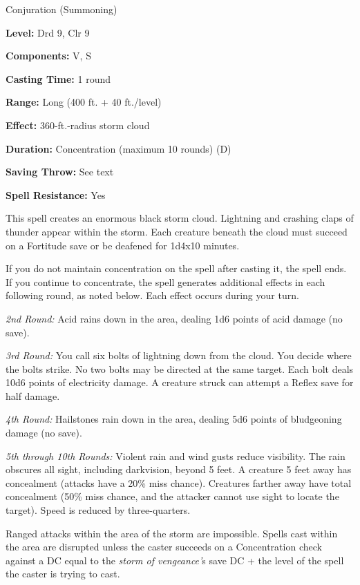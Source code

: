 
Conjuration (Summoning)

\textbf{Level:} Drd 9, Clr 9

\textbf{Components:} V, S

\textbf{Casting Time:} 1 round

\textbf{Range:} Long (400 ft. + 40 ft./level)

\textbf{Effect:} 360-ft.-radius storm cloud

\textbf{Duration:} Concentration (maximum 10 rounds) (D)

\textbf{Saving Throw:} See text

\textbf{Spell Resistance:} Yes

This spell creates an enormous black storm cloud. Lightning and crashing claps 
of thunder appear within the storm. Each creature beneath the cloud must succeed 
on a Fortitude save or be deafened for 1d4x10 minutes.

If you do not maintain concentration on the spell after casting it, the spell ends. 
 If you continue to concentrate, the spell generates additional effects in each 
following round, as noted below. Each effect occurs during your turn.

\textit{2nd Round:} Acid rains down in the area, dealing 1d6 points of acid damage 
(no save).

\textit{3rd Round:} You call six bolts of lightning down from the cloud. You decide 
where the bolts strike. No two bolts may be directed at the same target. Each bolt 
deals 10d6 points of electricity damage. A creature struck can attempt a Reflex 
save for half damage.

\textit{4th Round:} Hailstones rain down in the area, dealing 5d6 points of bludgeoning 
damage (no save).

\textit{5th through 10th Rounds:} Violent rain and wind gusts reduce visibility. 
The rain obscures all sight, including darkvision, beyond 5 feet. A creature 5 
feet away has concealment (attacks have a 20\% miss chance). Creatures farther 
away have total concealment (50\% miss chance, and the attacker cannot use sight 
to locate the target). Speed is reduced by three-quarters.

Ranged attacks within the area of the storm are impossible. Spells cast within 
the area are disrupted unless the caster succeeds on a Concentration check against 
a DC equal to the \textit{storm of vengeance'}s save DC + the level of the spell 
the caster is trying to cast.

